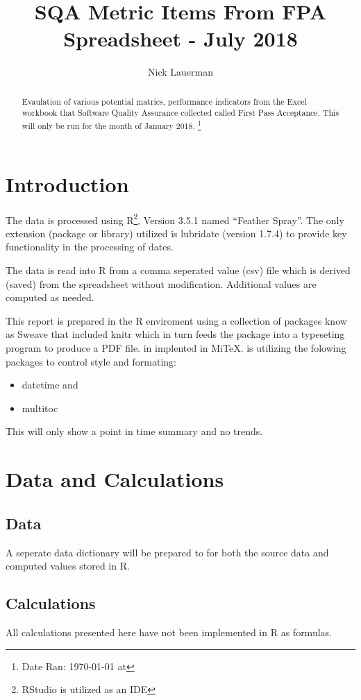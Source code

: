\documentclass{article}
\title{SQA Metric Items From FPA Spreadsheet - July 2018}
\author{Nick Lauerman}
\date{}
\begin{document}

\maketitle

\begin{abstract}
Evaulation of various potential matrics, performance indicators from the Excel
workbook that Software Quality Assurance collected called First Pass
Acceptance. This will only be run for the month of January 2018.
\footnote{Date Ran: \today{} at \currenttime}
\end{abstract}

\tableofcontents

\section{Introduction}
The data is processed using R\footnote{RStudio is utilized as an IDE}, Version
3.5.1 named ``Feather Spray''. The only extension (package or library) utilized is
lubridate (version 1.7.4) to provide key functionality in the processing of dates.

The data is read into R from a comma seperated value (csv) file which is derived (saved)
from the spreadsheet without modification. Additional values are computed as needed.

This report is prepared in the R enviroment using a collection of packages know as
Sweave that included knitr which in turn feeds the package into \LaTeXe{} a typeseting
program to produce a PDF file. \LaTeXe{} in implented in Mi\TeX. \LaTeXe{} is utilizing
the folowing packages to control style and formating:
\begin{itemize}
\item datetime and
\item multitoc
\end{itemize}

This will only show a point in time summary and no trends.

\section{Data and Calculations}
\subsection{Data}
A seperate data dictionary will be prepared to for both the source data
and computed values stored in R.

\subsection{Calculations}
All calculations presented here have not been implemented in R as formulas.
\end{document}
